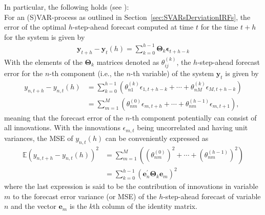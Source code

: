 \documentclass[a4paper,11pt,listof=nochaptergap,oneside,pointednumbers,bibtotoc,bigheadings,liststotoc,hidelinks]{scrbook}
\theoremstyle{mysatz}
\theoremstyle{mydefinition}
\theoremstyle{mytheorem}
\theoremstyle{mybemerkung}
\newcommand{\vect}[1]{\boldsymbol{\mathbf{#1}}}
\begin{document}
In particular, the following holds (see \citealp{lutkepohl:05}):\\
For an (S)VAR-process as outlined in Section~\ref{sec:SVARsDerviationIRFs}, the error of the optimal $h$-step-ahead forecast computed at time $t$ for the time $t+h$ for the system is given by 
\begin{equation} \label{eq:FVED1}
\begin{split}
 		\vect{y}_{t+h} - \vect{y}_t(h) = \sum\limits_{k=0}^{h-1} \vect{\Theta}_k\vect{\epsilon}_{t+h-k}
\end{split}								
\end{equation}
With the elements of the $\vect{\Theta}_k$ matrices denoted as $\theta_{ij}^{(k)}$, the $h$-step-ahead forecast error for the $n$-th component (i.e., the $n$-th variable) of the system $\vect{y}_{t}$ is given by 
\begin{equation} \label{eq:FVED2}
\begin{split}
 		y_{n, t+h} - y_{n, t}(h) & = \sum\limits_{k=0}^{h-1} (\theta_{n1}^{(k)}\epsilon_{1, t+h-k} + \cdots + \theta_{nM}^{(k)}\epsilon_{M, t+h-k})\\
						& = \sum\limits_{m=1}^{M} (\theta_{nm}^{(0)}\epsilon_{m, t+h} + \cdots + \theta_{nm}^{(h-1)}\epsilon_{m, t+1}),
\end{split}								
\end{equation}
meaning that the forecast error of the $n$-th component potentially can consist of all innovations. With the innovations $\epsilon_{m,t}$ being uncorrelated and having unit variances, the MSE of $y_{n, t}(h)$ can be conveniently expressed as
\begin{equation} \label{eq:FVED3}
\begin{split}
 		\mathbb{E}(y_{n, t+h} - y_{n, t}(h))^2 & =  \sum\limits_{m=1}^{M} \left((\theta_{nm}^{(0)} )^2+ \cdots + (\theta_{nm}^{(h-1)})^2\right) \\
		& =  \sum\limits_{k=0}^{h-1} (\vect{e}_n^'\vect{\Theta}_k\vect{e}_m)^2
\end{split}								
\end{equation}
where the last expression is said to be the contribution of innovations in variable $m$ to the forecast error variance (or MSE) of the $h$-step-ahead forecast of variable $n$ and the vector $\vect{e}_m$ is the $k$th column of the identity matrix.
\end{document}
